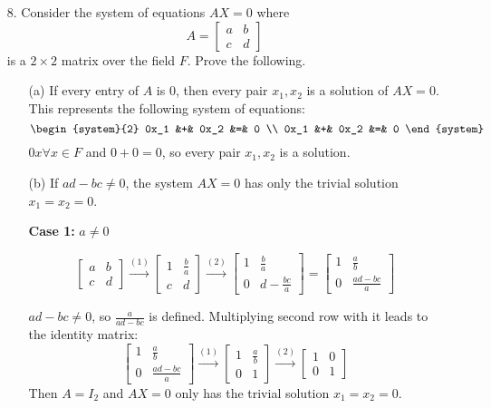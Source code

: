 \documentclass{article}
\begin{document}
\begin{enumerate}[listparindent=\parindent]
\item[8.] Consider the system of equations \(AX = 0\) where
    \[
        A = \begin{bmatrix}
            a & b \\ c & d
        \end{bmatrix}
    \] is a \(2 \times 2\) matrix over the field \(F\). Prove the following.

\begin{enumerate}[listparindent=\parindent]
\item[(a)] If every entry of \(A\) is 0, then every pair \(x_1, x_2\) is a solution of \(AX = 0\).
This represents the following system of equations:
\[
    \begin{system}{2}
        0x_1 &+& 0x_2 &=& 0 \\
        0x_1 &+& 0x_2 &=& 0
    \end{system}
\]
\(0x \forall x \in F\) and \(0 + 0 = 0\), so every pair \(x_1, x_2\) is a solution.

\item[(b)] If \(ad - bc \neq 0\), the system \(AX = 0\) has only the trivial solution \(x_1 = x_2 = 0\).

\textbf{Case 1:} \(a \neq 0\)

\[
    \begin{bmatrix}
        a & b \\
        c & d
    \end{bmatrix}
    \xrightarrow{(1)}
    \begin{bmatrix}
        1 & \frac{b}{a} \\
        c & d
    \end{bmatrix}
    \xrightarrow{(2)}
    \begin{bmatrix}
        1 & \frac{b}{a} \\
        0 & d - \frac{bc}{a}
    \end{bmatrix}
    =
    \begin{bmatrix}
        1 & \frac{a}{b} \\
        0 & \frac{ad - bc}{a}
    \end{bmatrix}
\]

\(ad - bc \neq 0\), so \( \frac{a}{ad - bc} \) is defined. Multiplying second row with it leads to the identity matrix:
\[
    \begin{bmatrix}
        1 & \frac{a}{b} \\
        0 & \frac{ad - bc}{a}
    \end{bmatrix}
    \xrightarrow{(1)}
    \begin{bmatrix}
        1 & \frac{a}{b} \\
        0 & 1
    \end{bmatrix}
    \xrightarrow{(2)}
    \begin{bmatrix}
        1 & 0 \\
        0 & 1
    \end{bmatrix}
\]
Then \(A = I_2\) and \(AX = 0\) only has the trivial solution \(x_1 = x_2 = 0\).


\end{enumerate}
\end{enumerate}
\end{document}
